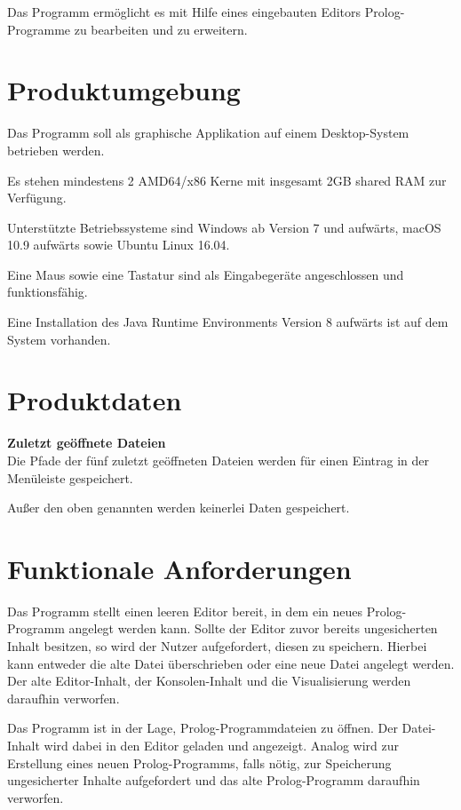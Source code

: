 \documentclass[parskip=full,11pt,twoside]{scrartcl}
\begin{document}
Das Programm ermöglicht es mit Hilfe eines eingebauten Editors Prolog-Programme zu bearbeiten und zu erweitern.

\section{Produktumgebung}

Das Programm soll als graphische Applikation auf einem Desktop-System betrieben werden.

Es stehen mindestens 2 AMD64/x86 Kerne mit insgesamt 2GB shared RAM zur Verfügung.

Unterstützte Betriebssysteme sind Windows ab Version 7 und aufwärts, macOS 10.9 aufwärts sowie Ubuntu Linux 16.04.

Eine Maus sowie eine Tastatur sind als Eingabegeräte angeschlossen und funktionsfähig.

Eine Installation des Java Runtime Environments Version 8 aufwärts ist auf dem System vorhanden.

\section{Produktdaten}

\textbf{Zuletzt geöffnete Dateien} \\
Die Pfade der fünf zuletzt geöffneten Dateien werden für einen Eintrag in der Menüleiste gespeichert.

Außer den oben genannten werden keinerlei Daten gespeichert.
\section{Funktionale Anforderungen}


Das Programm stellt einen leeren Editor bereit, in dem ein neues Prolog-Programm angelegt werden kann. Sollte der Editor zuvor bereits ungesicherten Inhalt besitzen, so wird der Nutzer aufgefordert, diesen zu speichern. Hierbei kann entweder die alte Datei überschrieben oder eine neue Datei angelegt werden. Der alte Editor-Inhalt, der Konsolen-Inhalt und die Visualisierung werden daraufhin verworfen. 


Das Programm ist in der Lage, Prolog-Programmdateien zu öffnen. Der Datei-Inhalt wird dabei in den Editor geladen und angezeigt. Analog wird zur Erstellung eines neuen Prolog-Programms, falls nötig, zur Speicherung ungesicherter Inhalte aufgefordert und das alte Prolog-Programm daraufhin verworfen.
\end{document}
